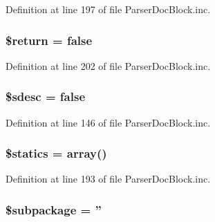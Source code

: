 \-Definition at line 197 of file \-Parser\-Doc\-Block.\-inc.

\hypertarget{classparser_doc_block_a9e8633cf48f7c5fc8cc9f5fa31450b99}{
\subsubsection[{\$return}]{\setlength{\rightskip}{0pt plus 5cm}\${\bf return} = false}}\label{classparser_doc_block_a9e8633cf48f7c5fc8cc9f5fa31450b99}


\-Definition at line 202 of file \-Parser\-Doc\-Block.\-inc.

\hypertarget{classparser_doc_block_a74ada69e01ee1dee83a339720be17b5c}{
\subsubsection[{\$sdesc}]{\setlength{\rightskip}{0pt plus 5cm}\$sdesc = false}}\label{classparser_doc_block_a74ada69e01ee1dee83a339720be17b5c}


\-Definition at line 146 of file \-Parser\-Doc\-Block.\-inc.

\hypertarget{classparser_doc_block_a6f9b86cb70b333ced9db7133842c4880}{
\subsubsection[{\$statics}]{\setlength{\rightskip}{0pt plus 5cm}\$statics = array()}}\label{classparser_doc_block_a6f9b86cb70b333ced9db7133842c4880}


\-Definition at line 193 of file \-Parser\-Doc\-Block.\-inc.

\hypertarget{classparser_doc_block_ac601dc8dc2a086b6381128cc9c7a3fc5}{
\subsubsection[{\$subpackage}]{\setlength{\rightskip}{0pt plus 5cm}\$subpackage = ''}}\label{classparser_doc_block_ac601dc8dc2a086b6381128cc9c7a3fc5}


